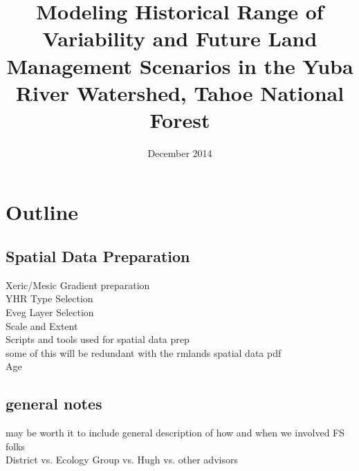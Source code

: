 \documentclass[12pt]{book}
\begin{document}
\title{Modeling Historical Range of Variability and Future Land Management Scenarios in the Yuba River Watershed, Tahoe National Forest}
\date{December 2014}

\section*{Outline}
\subsection*{Spatial Data Preparation}
Xeric/Mesic Gradient preparation\\
YHR Type Selection\\
Eveg Layer Selection\\
Scale and Extent\\
Scripts and tools used for spatial data prep\\
some of this will be redundant with the rmlands spatial data pdf\\
Age

\subsection*{general notes}
may be worth it to include general description of how and when we involved FS folks\\
District vs. Ecology Group vs. Hugh vs. other advisors\\


\tableofcontents 
 

\mainmatter 
 
 
 
 
%  

\backmatter 
 
 
\end{document}
